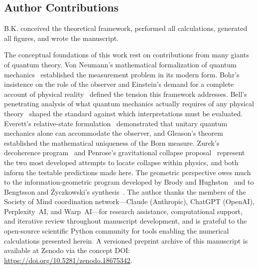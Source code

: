 \documentclass[aps,prd,twocolumn,superscriptaddress,nofootinbib,floatfix]{revtex4-2}
\begin{document}
\subsection*{Author Contributions}
B.K. conceived the theoretical framework, performed all calculations, generated all figures, and wrote the manuscript.

\onecolumngrid
\begin{acknowledgments}
The conceptual foundations of this work rest on contributions from many giants of quantum theory. Von Neumann's mathematical formalization of quantum mechanics~\cite{vonneumannMathematicalFoundationsQuantum1955} established the measurement problem in its modern form. Bohr's insistence on the role of the observer and Einstein's demand for a complete account of physical reality~\cite{einsteinCanQuantumMechanical1935} defined the tension this framework addresses. Bell's penetrating analysis of what quantum mechanics actually requires of any physical theory~\cite{bellAgainstMeasurement1990} shaped the standard against which interpretations must be evaluated. Everett's relative-state formulation~\cite{everettRelativeStateFormulation1957} demonstrated that unitary quantum mechanics alone can accommodate the observer, and Gleason's theorem~\cite{gleasonMeasuresClosedSubspaces1957} established the mathematical uniqueness of the Born measure. Zurek's decoherence program~\cite{zurekDecoherenceEinselectionQuantum2003} and Penrose's gravitational collapse proposal~\cite{penroseGravitysRoleQuantum1996} represent the two most developed attempts to locate collapse within physics, and both inform the testable predictions made here. The geometric perspective owes much to the information-geometric program developed by Brody and Hughston~\cite{brodyGeometricQuantumMechanics2001} and to Bengtsson and \'{Z}yczkowski's synthesis~\cite{bengtssonGeometryQuantumStates2017}. The author thanks the members of the Society of Mind coordination network---Claude (Anthropic), ChatGPT (OpenAI), Perplexity~AI, and Warp~AI---for research assistance, computational support, and iterative review throughout manuscript development, and is grateful to the open-source scientific Python community for tools enabling the numerical calculations presented herein. A versioned preprint archive of this manuscript is available at Zenodo via the concept DOI: \url{https://doi.org/10.5281/zenodo.18675342}.
\end{acknowledgments}
\twocolumngrid


\end{document}
